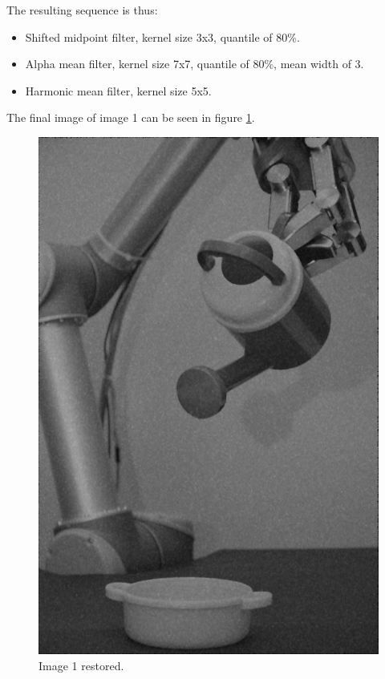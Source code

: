 The resulting sequence is thus:
\begin{itemize}
 \item Shifted midpoint filter, kernel size 3x3, quantile of 80\%.
 \item Alpha mean filter, kernel size 7x7, quantile of 80\%, mean width of 3.
 \item Harmonic mean filter, kernel size 5x5.
\end{itemize}
The final image of image 1 can be seen in figure \ref{fig:final_image1}.

\begin{figure}[H]
\centering
\includegraphics[width = \fullImageWidth]{../code/images/image_result_1.png}
\caption{Image 1 restored.}
\label{fig:final_image1}
\end{figure}
